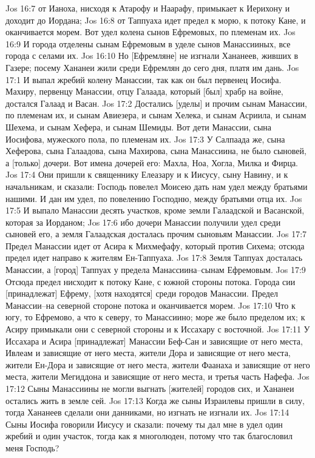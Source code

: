 Jos 16:7  от Ианоха, нисходя к Атарофу и Наарафу, примыкает к Иерихону и доходит до Иордана;
Jos 16:8  от Таппуаха идет предел к морю, к потоку Кане, и оканчивается морем. Вот удел колена сынов Ефремовых, по племенам их.
Jos 16:9  И города отделены сынам Ефремовым в уделе сынов Манассииных, все города с селами их.
Jos 16:10  Но [Ефремляне] не изгнали Хананеев, живших в Газере; посему Хананеи жили среди Ефремлян до сего дня, платя им дань.
Jos 17:1  И выпал жребий колену Манассии, так как он был первенец Иосифа. Махиру, первенцу Манассии, отцу Галаада, который [был] храбр на войне, достался Галаад и Васан.
Jos 17:2  Достались [уделы] и прочим сынам Манассии, по племенам их, и сынам Авиезера, и сынам Хелека, и сынам Асриила, и сынам Шехема, и сынам Хефера, и сынам Шемиды. Вот дети Манассии, сына Иосифова, мужеского пола, по племенам их.
Jos 17:3  У Салпаада же, сына Хеферова, сына Галаадова, сына Махирова, сына Манассиина, не было сыновей, а [только] дочери. Вот имена дочерей его: Махла, Ноа, Хогла, Милка и Фирца.
Jos 17:4  Они пришли к священнику Елеазару и к Иисусу, сыну Навину, и к начальникам, и сказали: Господь повелел Моисею дать нам удел между братьями нашими. И дан им удел, по повелению Господню, между братьями отца их.
Jos 17:5  И выпало Манассии десять участков, кроме земли Галаадской и Васанской, которая за Иорданом;
Jos 17:6  ибо дочери Манассии получили удел среди сыновей его, а земля Галаадская досталась прочим сыновьям Манассии.
Jos 17:7  Предел Манассии идет от Асира к Михмефафу, который против Сихема; отсюда предел идет направо к жителям Ен-Таппуаха.
Jos 17:8  Земля Таппуах досталась Манассии, а [город] Таппуах у предела Манассиина--сынам Ефремовым.
Jos 17:9  Отсюда предел нисходит к потоку Кане, с южной стороны потока. Города сии [принадлежат] Ефрему, [хотя находятся] среди городов Манассии. Предел Манассии--на северной стороне потока и оканчивается морем.
Jos 17:10  Что к югу, то Ефремово, а что к северу, то Манассиино; море же было пределом их; к Асиру примыкали они с северной стороны и к Иссахару с восточной.
Jos 17:11  У Иссахара и Асира [принадлежат] Манассии Беф-Сан и зависящие от него места, Ивлеам и зависящие от него места, жители Дора и зависящие от него места, жители Ен-Дора и зависящие от него места, жители Фаанаха и зависящие от него места, жители Мегиддона и зависящие от него места, и третья часть Нафефа.
Jos 17:12  Сыны Манассиины не могли выгнать [жителей] городов сих, и Хананеи остались жить в земле сей.
Jos 17:13  Когда же сыны Израилевы пришли в силу, тогда Хананеев сделали они данниками, но изгнать не изгнали их.
Jos 17:14  Сыны Иосифа говорили Иисусу и сказали: почему ты дал мне в удел один жребий и один участок, тогда как я многолюден, потому что так благословил меня Господь?
